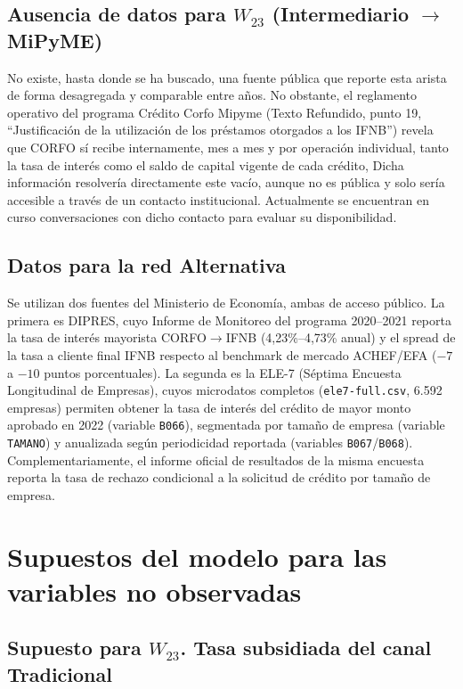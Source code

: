 \subsection[Ausencia de datos para W23 (Intermediario a MiPyME)]{Ausencia de datos para $W_{23}$ (Intermediario $\to$ MiPyME)}

No existe, hasta donde se ha buscado, una fuente pública que reporte esta arista de forma desagregada y comparable entre años. No obstante, el reglamento operativo del programa Crédito Corfo Mipyme (Texto Refundido, punto 19, ``Justificación de la utilización de los préstamos otorgados a los IFNB'') revela que CORFO sí recibe internamente, mes a mes y por operación individual, tanto la tasa de interés como el saldo de capital vigente de cada crédito, Dicha información resolvería directamente este vacío, aunque no es pública y solo sería accesible a través de un contacto institucional. Actualmente se encuentran en curso conversaciones con dicho contacto para evaluar su disponibilidad.

\subsection{Datos para la red Alternativa}

Se utilizan dos fuentes del Ministerio de Economía, ambas de acceso público. La primera es DIPRES, cuyo Informe de Monitoreo del programa 2020--2021 reporta la tasa de interés mayorista CORFO$\to$IFNB (4,23\%--4,73\% anual) y el spread de la tasa a cliente final IFNB respecto al benchmark de mercado ACHEF/EFA ($-7$ a $-10$ puntos porcentuales). La segunda es la ELE-7 (Séptima Encuesta Longitudinal de Empresas), cuyos microdatos completos (\texttt{ele7-full.csv}, 6.592 empresas) permiten obtener la tasa de interés del crédito de mayor monto aprobado en 2022 (variable \texttt{B066}), segmentada por tamaño de empresa (variable \texttt{TAMANO}) y anualizada según periodicidad reportada (variables \texttt{B067}/\texttt{B068}). Complementariamente, el informe oficial de resultados de la misma encuesta reporta la tasa de rechazo condicional a la solicitud de crédito por tamaño de empresa.

\section{Supuestos del modelo para las variables no observadas}
\label{sec:supuestos}

\subsection[Supuesto para W23. Tasa subsidiada del canal Tradicional]{Supuesto para $W_{23}$. Tasa subsidiada del canal Tradicional}

